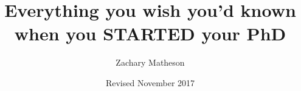 \documentclass[a4paper,12pt]{book}
\begin{document}
\author{Zachary Matheson}
\title{Everything you wish you'd known when you STARTED your PhD}
\date{Revised November 2017}

\frontmatter
\maketitle
\tableofcontents

\mainmatter

\backmatter


\end{document}
